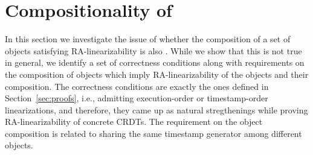 
\section{Compositionality of \CRDTLin{}}
\label{sec:compositionality}




In this section we investigate the issue of whether the composition of a set of objects satisfying RA-linearizability is also \crdtlinearizable{}. While we show that this is not true in general, we identify a set of correctness conditions along with requirements on the composition of objects which imply RA-linearizability of the objects and their composition. The correctness conditions are exactly the ones defined in Section~\ref{sec:proofs}, i.e., admitting execution-order or timestamp-order linearizations, and therefore, they came up as natural stregthenings while proving RA-linearizability of concrete CRDTs. The requirement on the object composition is related to sharing the same timestamp generator among different objects.

